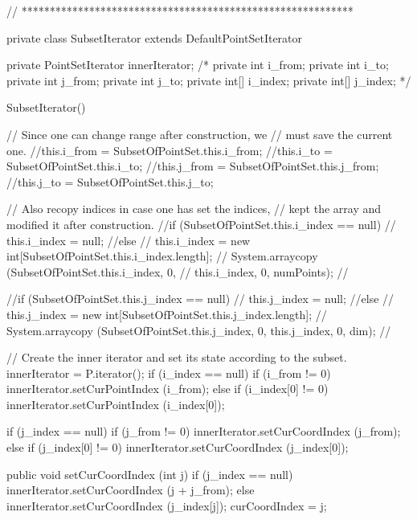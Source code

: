 \begin{code}
\begin{hide}
   // ***********************************************************

   private class SubsetIterator extends DefaultPointSetIterator {

      private PointSetIterator innerIterator;
/*
      private int i_from;
      private int i_to;
      private int j_from;
      private int j_to;
      private int[] i_index;
      private int[] j_index;
*/

      SubsetIterator() {
         // Since one can change range after construction, we
         // must save the current one.
         //this.i_from = SubsetOfPointSet.this.i_from;
         //this.i_to = SubsetOfPointSet.this.i_to;
         //this.j_from = SubsetOfPointSet.this.j_from;
         //this.j_to = SubsetOfPointSet.this.j_to;

         // Also recopy indices in case one has set the indices,
         // kept the array and modified it after construction.
         //if (SubsetOfPointSet.this.i_index == null)
         //   this.i_index = null;
         //else {
         //   this.i_index = new int[SubsetOfPointSet.this.i_index.length];
         //   System.arraycopy (SubsetOfPointSet.this.i_index, 0,
         //             this.i_index, 0, numPoints);
         //}

         //if (SubsetOfPointSet.this.j_index == null)
         //   this.j_index = null;
         //else {
         //   this.j_index = new int[SubsetOfPointSet.this.j_index.length];
         //   System.arraycopy (SubsetOfPointSet.this.j_index, 0, this.j_index, 0, dim);
         //}

         // Create the inner iterator and set its state according to the subset.
         innerIterator = P.iterator();
         if (i_index == null) {
            if (i_from != 0)
               innerIterator.setCurPointIndex (i_from);
         }
         else {
            if (i_index[0] != 0)
               innerIterator.setCurPointIndex (i_index[0]);
         }

         if (j_index == null) {
            if (j_from != 0)
               innerIterator.setCurCoordIndex (j_from);
         }
         else {
            if (j_index[0] != 0)
               innerIterator.setCurCoordIndex (j_index[0]);
         }
      }

      public void setCurCoordIndex (int j) {
         if (j_index == null)
            innerIterator.setCurCoordIndex (j + j_from);
         else
            innerIterator.setCurCoordIndex (j_index[j]);
         curCoordIndex = j;
      }

}
\end{hide}
\end{code}
